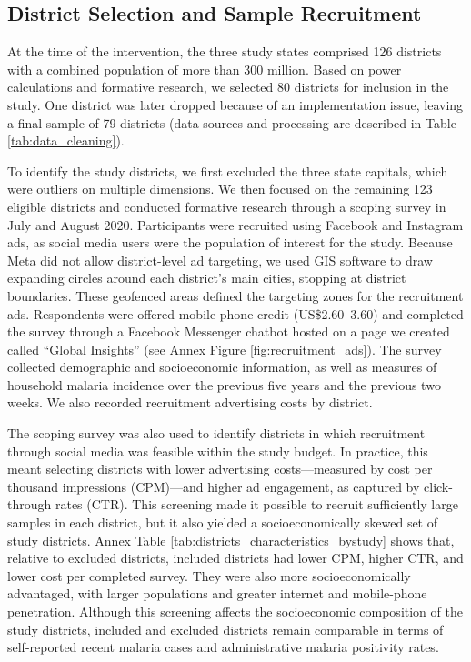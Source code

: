 \subsection{District Selection and Sample Recruitment}

At the time of the intervention, the three study states comprised 126 districts with a combined population of more than 300 million. Based on power calculations and formative research, we selected 80 districts for inclusion in the study. One district was later dropped because of an implementation issue, leaving a final sample of 79 districts (data sources and processing are described in Table \ref{tab:data_cleaning}).

To identify the study districts, we first excluded the three state capitals, which were outliers on multiple dimensions. We then focused on the remaining 123 eligible districts and conducted formative research through a scoping survey in July and August 2020. Participants were recruited using Facebook and Instagram ads, as social media users were the population of interest for the study. Because Meta did not allow district-level ad targeting, we used GIS software to draw expanding circles around each district’s main cities, stopping at district boundaries. These geofenced areas defined the targeting zones for the recruitment ads. Respondents were offered mobile-phone credit (US\$2.60--3.60) and completed the survey through a Facebook Messenger chatbot hosted on a page we created called ``Global Insights'' (see Annex Figure \ref{fig:recruitment_ads}). The survey collected demographic and socioeconomic information, as well as measures of household malaria incidence over the previous five years and the previous two weeks. We also recorded recruitment advertising costs by district.



The scoping survey was also used to identify districts in which recruitment through social media was feasible within the study budget. In practice, this meant selecting districts with lower advertising costs---measured by cost per thousand impressions (CPM)---and higher ad engagement, as captured by click-through rates (CTR). This screening made it possible to recruit sufficiently large samples in each district, but it also yielded a socioeconomically skewed set of study districts. Annex Table \ref{tab:districts_characteristics_bystudy} shows that, relative to excluded districts, included districts had lower CPM, higher CTR, and lower cost per completed survey. They were also more socioeconomically advantaged, with larger populations and greater internet and mobile-phone penetration. Although this screening affects the socioeconomic composition of the study districts, included and excluded districts remain comparable in terms of self-reported recent malaria cases and administrative malaria positivity rates.


